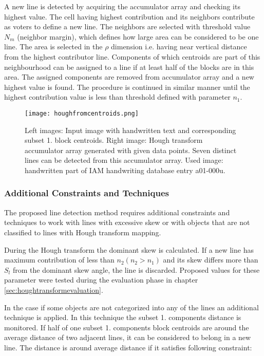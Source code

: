 \documentclass{article}
\begin{document}
            A new line is detected by acquiring the accumulator array and checking its highest value. The cell having highest contribution and its neighbors contribute as voters to define a new line. The neighbors are selected with threshold value $N_m$ (neighbor margin), which defines how large area can be considered to be one line. The area is selected in the $\rho$ dimension i.e. having near vertical distance from the highest contributor line. Components of which centroids are part of this neighbourhood can be assigned to a line if at least half of the blocks are in this area. The assigned components are removed from accumulator array and a new highest value is found. The procedure is continued in similar manner until the highest contribution value is less than threshold defined with parameter $n_1$.

            \begin{figure}[!ht]
              \centering
              \texttt{[image: houghfromcentroids.png]}
              \caption{Left images: Input image with handwritten text and corresponding subset 1. block centroids. Right image: Hough transform accumulator array generated with given data points. Seven distinct lines can be detected from this accumulator array. Used image: handwritten part of IAM handwriting database entry a01-000u. \label{fig:blockandacc} }
            \end{figure}

          \subsubsection{Additional Constraints and Techniques}
            The proposed line detection method requires additional constraints and techniques to work with lines with excessive skew or with objects that are not classified to lines with Hough transform mapping.

            During the Hough transform the dominant skew is calculated. If a new line has maximum contribution of less than $n_2 (n_2 > n_1)$ and its skew differs more than $S_l$ from the dominant skew angle, the line is discarded. Proposed values for these parameter were tested during the evaluation phase in chapter \ref{sec:houghtransformevaluation}.

            In the case if some objects are not categorized into any of the lines an additional technique is applied. In this technique the subset 1. components distance is monitored. If half of one subset 1. components block centroids are around the average distance of two adjacent lines, it can be considered to belong in a new line. The distance is around average distance if it satisfies following constraint:
\end{document}

